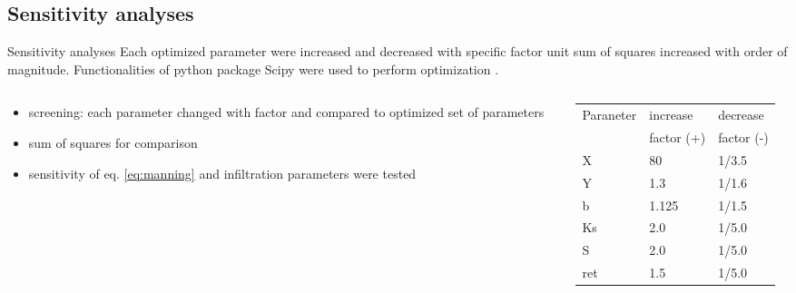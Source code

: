 
\subsection{Sensitivity analyses}
\begin{block}{Sensitivity analyses}
\justifying
Each optimized parameter were increased and decreased with specific factor unit sum of squares increased with order of magnitude.  Functionalities of python package Scipy were used to perform optimization \citep{scipy}.
\begin{columns}
        \begin{column}{0.25\textwidth}
            \begin{itemize}
                \item screening: each parameter changed with factor and compared to optimized set of parameters 
                \item sum of squares for comparison
                \item sensitivity of eq. \ref{eq:manning} and infiltration parameters were tested
            \end{itemize}
        \end{column}
    \begin{column}{0.25\textwidth}
        \begin{table}[]
            \small
            \begin{tabular}{lll}
                \hline
                \hline
                Paraneter & increase   & decrease \\
                          & factor (+) & factor (-) \\
                \hline
                X         & 80                  & 1/3.5               \\
                Y         & 1.3                 & 1/1.6               \\
                b         & 1.125               & 1/1.5               \\
                Ks        & 2.0                 & 1/5.0               \\
                S         & 2.0                 & 1/5.0               \\
                ret       & 1.5                 & 1/5.0              \\
                \hline
                \hline
            \end{tabular}
        \end{table}

\end{column}
\end{columns}
\end{block}
